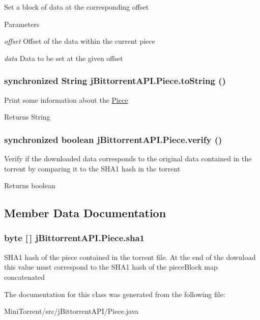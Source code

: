 \label{classj_bittorrent_a_p_i_1_1_piece_a57e510992d23328b321f623af02c118b}
Set a block of data at the corresponding offset 
\begin{DoxyParams}{Parameters}
\item[{\em offset}]Offset of the data within the current piece \item[{\em data}]Data to be set at the given offset \end{DoxyParams}
\hypertarget{classj_bittorrent_a_p_i_1_1_piece_a5f724f5241bc2843435fab2f2a3f7f90}{
\subsubsection[{toString}]{\setlength{\rightskip}{0pt plus 5cm}synchronized String jBittorrentAPI.Piece.toString ()}}
\label{classj_bittorrent_a_p_i_1_1_piece_a5f724f5241bc2843435fab2f2a3f7f90}
Print some information about the \hyperlink{classj_bittorrent_a_p_i_1_1_piece}{Piece} \begin{DoxyReturn}{Returns}
String 
\end{DoxyReturn}
\hypertarget{classj_bittorrent_a_p_i_1_1_piece_a735377bc6777a087f5f456477cd30183}{
\subsubsection[{verify}]{\setlength{\rightskip}{0pt plus 5cm}synchronized boolean jBittorrentAPI.Piece.verify ()}}
\label{classj_bittorrent_a_p_i_1_1_piece_a735377bc6777a087f5f456477cd30183}
Verify if the downloaded data corresponds to the original data contained in the torrent by comparing it to the SHA1 hash in the torrent \begin{DoxyReturn}{Returns}
boolean 
\end{DoxyReturn}


\subsection{Member Data Documentation}
\hypertarget{classj_bittorrent_a_p_i_1_1_piece_ad13fc2f3c99d51ef782f875d882341cc}{
\subsubsection[{sha1}]{\setlength{\rightskip}{0pt plus 5cm}byte \mbox{[}$\,$\mbox{]} {\bf jBittorrentAPI.Piece.sha1}}}
\label{classj_bittorrent_a_p_i_1_1_piece_ad13fc2f3c99d51ef782f875d882341cc}
SHA1 hash of the piece contained in the torrent file. At the end of the download this value must correspond to the SHA1 hash of the pieceBlock map concatenated 

The documentation for this class was generated from the following file:\begin{DoxyCompactItemize}
\item 
MiniTorrent/src/jBittorrentAPI/Piece.java\end{DoxyCompactItemize}
